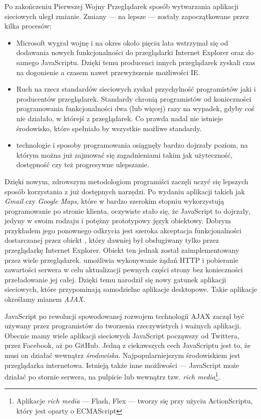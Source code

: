 Po zakończeniu Pierwszej Wojny Przeglądarek sposób wytwarzania aplikacji sieciowych uległ zmianie. Zmiany --- na lepsze --- zostały zapoczątkowane przez kilka procesów\cite{stefanov10}: 
\begin{itemize}
 \item Microsoft wygrał wojnę i na okres około pięciu lata wstrzymał się od dodawania nowych funkcjonalności do przeglądarki Internet Explorer oraz do samego JavaScriptu. Dzięki temu producenci innych przeglądarek zyskali czas na dogonienie a czasem nawet przewyższenie możliwości IE.
 \item Ruch na rzecz standardów sieciowych zyskał przychylność programistów jaki i producentów przeglądarek. Standardy chronią programistów od konieczności programowania funkcjonalności dwa (lub więcej) razy na wypadek, gdyby coś nie działało, w którejś z przeglądarek. Co prawda nadal nie istnieje środowisko, które spełniało by wszystkie możliwe standardy.
 \item technologie i sposoby programowania osiągnęły bardzo dojrzały poziom, na którym można już zajmować się zagadnieniami takim jak użyteczność, dostępność czy też progresywne ulepszanie. 
\end{itemize}
Dzięki nowym, zdrowszym metodologiom programiści zaczęli uczyć się lepszych sposób korzystania z już dostępnych narzędzi. Po wydaniu aplikacji takich jak \emph{Gmail} czy \emph{Google Maps}, które w bardzo szerokim stopniu wykorzystują programowanie po stronie klienta, oczywiste stało się, że JavaScript to dojrzały, jedyny w swoim rodzaju i potężny prototypowy język obiektowy\cite{stefanov10}. Dobrym przykładem jego ponownego odkrycia jest szeroka akceptacja funkcjonalności dostarczanej przez obiekt , który dawniej był obsługiwany tylko przez przeglądarkę Internet Explorer. Obiekt ten jednak został zaimplementowany przez wiele przeglądarek.  umożliwia wykonywanie żądań HTTP i pobieranie zawartości serwera w celu aktualizacji pewnych części strony bez konieczności przeładowanie jej całej. Dzięki temu narodził się nowy gatunek aplikacji sieciowych, które przypominają samodzielne aplikacje desktopowe. Takie aplikacje określamy mianem \emph{AJAX}.

JavaScript po rewolucji spowodowanej rozwojem technologii AJAX zaczął być używany przez programistów do tworzenia rzeczywistych i ważnych aplikacji. Obecnie mamy wiele aplikacji sieciowych JavaScript począwszy od Twittera, przez Facebook, aż po GitHub\cite{cantelon14}. Jedną z ciekawszych cech JavaScriptu jest to, że musi on działać wewnątrz \emph{środowiska}. Najpopularniejszym środowiskiem jest przeglądarka internetowa. Istnieją także inne możliwości --- JavaScript może działać po stornie serwera, na pulpicie lub wewnątrz tzw. \emph{rich media}\footnote{Aplikacje \textit{rich media} --- Flash, Flex --- tworzy się przy użyciu ActionScriptu, który jest oparty o ECMAScript}. 

